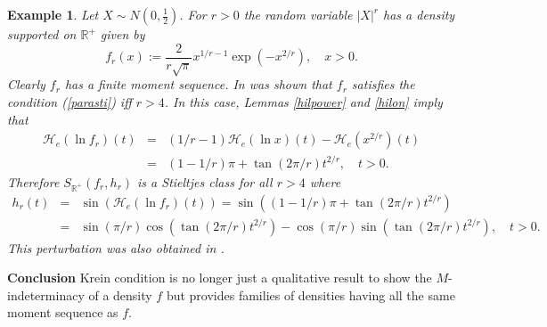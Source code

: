 \documentclass{amsart}
\newtheorem{example}[theorem]{Example}
\newcommand{\R}{\mathbb{R}}
\begin{document}
\begin{example}
Let $X\sim N(0,\frac{1}{2})$. For $r>0$ the random variable $|X|^r$ has a density supported on $\R^+$ given by
$$f_r(x):=\frac{2}{r\sqrt{\pi}}x^{1/r-1}\exp(-x^{2/r}), \quad x>0.$$
Clearly $f_r$ has a finite moment sequence. In \cite{Stoyanov4} was shown that $f_r$ satisfies the condition (\ref{parasti}) iff $r>4$.
In this case, Lemmas \ref{hilpower} and \ref{hilon} imply that
\begin{eqnarray*}
\mathcal{H}_e\left(\ln f_r\right)(t)&=&\left(1/r-1\right)\mathcal{H}_e (\ln x)(t)-\mathcal{H}_e\left(x^{2/r}\right)(t)\\
&=& (1-1/r)\pi+\tan(2\pi/r)t^{2/r}, \quad t> 0.
\end{eqnarray*}
Therefore $S_{\mathbb{R}^+}\left( f_r,h_r \right) $ is a Stieltjes class for all $r>4$ where
\begin{eqnarray*}
h_r(t)&=&\sin(\mathcal{H}_e\left(\ln f_r\right)(t))=\sin((1-1/r)\pi+\tan(2\pi/r)t^{2/r})\\
&=&  \sin(\pi/r)\cos(\tan(2\pi/r)t^{2/r})-\cos(\pi/r)\sin(\tan(2\pi/r) t^{2/r}),  \quad t>0.
\end{eqnarray*}
This perturbation was also obtained in \cite{Berg}.
\end{example}

\textbf{Conclusion} Krein condition is no longer just a qualitative result to show the $M$-indeterminacy of a density $f$ but provides families of densities having all the same moment sequence as $f$.

{}

\end{document}
